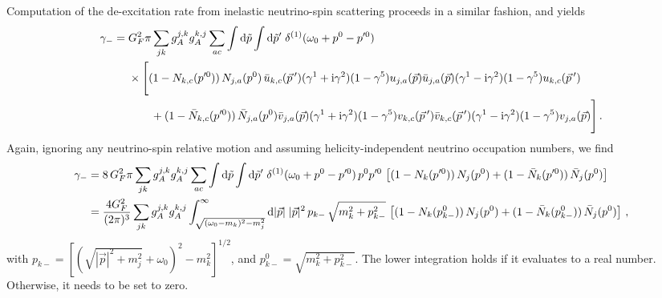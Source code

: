 \documentclass[aps,prd,10pt,twocolumn,superscriptaddress,floatfix,nofootinbib,amsmath,amssymb,altaffilletter,preprintnumbers]{revtex4-1}
\begin{document}
Computation of the de-excitation rate from inelastic neutrino-spin scattering proceeds in a similar fashion, and yields
\begin{equation}
\begin{aligned}
\gamma_{-}= & \; G_F^2\pi \sum_{jk} g_A^{j,k} g_A^{k,j} \sum_{ac}  
    \int {\rm d} \tilde{p} \int {\rm d} \tilde{p}' \; \delta^{(1)}(\omega_0+p^0-p'^0) \\
  &\; \times \Bigg[(1-N_{k,c}(p'^0)) \, N_{j,a}(p^0)\, \bar{u}_{k,c}(\vec{p}\,') (\gamma^1+ {\rm i} \gamma^2)(1-\gamma^5) u_{j,a}(\vec{p}) 
    \bar{u}_{j,a}(\vec{p}) (\gamma^1- {\rm i} \gamma^2)(1-\gamma^5) u_{k,c}(\vec{p}\,') \\
&\; \qquad +(1-\bar{N}_{k,c}(p'^0))\, \bar{N}_{j,a}(p^0)\bar{v}_{j,a}(\vec{p}) (\gamma^1+ {\rm i} \gamma^2)(1-\gamma^5) v_{k,c}(\vec{p}\,') \bar{v}_{k,c}(\vec{p}\,') (\gamma^1- {\rm i} \gamma^2)(1-\gamma^5) v_{j,a}(\vec{p})  \Bigg]\,.
    \label{eq:rate2heuristic}
    \end{aligned}
\end{equation}
Again, ignoring any neutrino-spin relative motion and assuming  helicity-independent neutrino occupation numbers, we find
\begin{equation}
\begin{aligned}
\gamma_{-}= & \;8  \, G_F^2 \pi \sum_{jk} g_A^{j,k} g_A^{k,j} \sum_{ac}  
    \int {\rm d} \tilde{p} \int {\rm d} \tilde{p}' \; \delta^{(1)}(\omega_0+p^0-p'^0) \, p^0 p'^0\, \left[(1-N_{k}(p'^0)) \, N_{j}(p^0)  +(1-\bar{N}_{k}(p'^0))\, \bar{N}_{j}(p^0)\right] \\
    =&\;  \frac{4G_F^2}{(2 \pi)^3} \sum_{jk} g_A^{j,k} g_A^{k,j}  
    \int_{\sqrt{(\omega_0-m_k)^2-m_j^2}}^\infty  {\rm d} |\vec{p}| \;|\vec{p}|^2\, p_{k-}\, \sqrt{m_k^2+p^2_{k-}} \,  
    \left[(1-N_{k}(p^0_{k-})) \, N_{j}(p^0)  +(1-\bar{N}_{k}(p^0_{k-}))\, \bar{N}_{j}(p^0)\right]\,,
    \label{eq:gamma-heuristic}
    \end{aligned}
\end{equation}
with  $p_{k-}=[(\sqrt{|\vec{p}|^2+m_j^2}+\omega_0)^2-m_k^2]^{1/2}$, and $p^0_{k-}=\sqrt{m_k^2+p^2_{k-}}$.    The lower integration holds if it evaluates to a real number.  Otherwise, it needs to be set to zero. 
\end{document}
